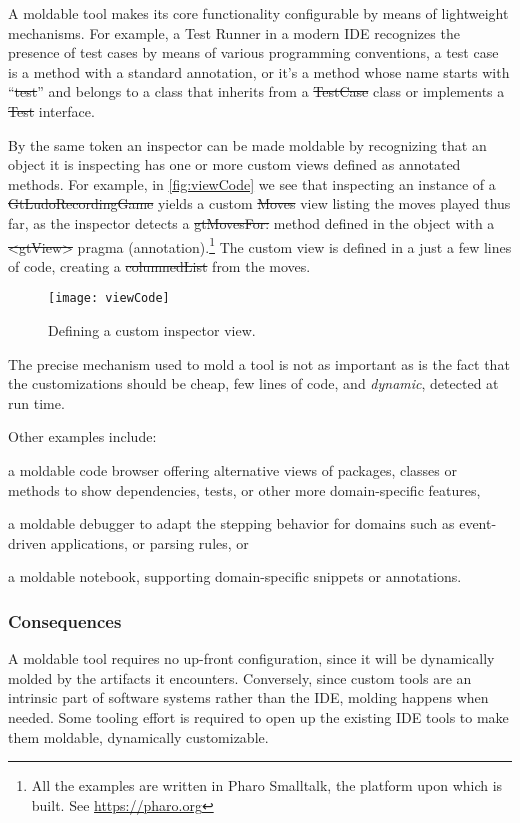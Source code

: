 \documentclass[sigconf]{acmart}
\newcommand{\GT}{\lst{GT}\xspace} %
\begin{document}
A moldable tool makes its core functionality configurable by means of lightweight mechanisms.
For example, a Test Runner in a modern IDE recognizes the presence of test cases by means of various programming conventions, \ie a test case is a method with a standard annotation, or it's a method whose name starts with ``\st{test}'' and belongs to a class that inherits from a \st{TestCase} class or implements a \st{Test} interface.

By the same token an inspector can be made moldable by recognizing that an object it is inspecting has one or more custom views defined as annotated methods.
For example, in \autoref{fig:viewCode} we see that inspecting an instance of a \st{GtLudoRecordingGame} yields a custom \st{Moves} view listing the moves played thus far, as the inspector detects a \st{gtMovesFor:} method defined in the object with a \st{<gtView>} pragma (\ie annotation).\footnote{All the examples are written in Pharo Smalltalk, the platform upon which \GT is built. See \url{https://pharo.org}}
The custom view is defined in a just a few lines of code, creating a \st{columnedList} from the moves.

\begin{figure}[h]
  \texttt{[image: viewCode]}
  \caption{Defining a custom inspector view.}
  \label{fig:viewCode}
\end{figure}

The precise mechanism used to mold a tool is not as important as is the fact that the customizations should be cheap, \ie few lines of code, and \emph{dynamic}, \ie detected at run time.

Other examples include:
\begin{inparaenum}[(i)]
\item a moldable code browser offering alternative views of packages, classes or methods to show dependencies, tests, or other more domain-specific features,
\item a moldable debugger to adapt the stepping behavior for domains such as event-driven applications, or parsing rules, or
\item a moldable notebook, supporting domain-specific snippets or annotations.
\end{inparaenum}

\subsubsection*{Consequences}
A moldable tool requires no up-front configuration, since it will be dynamically molded by the artifacts it encounters.
Conversely, since custom tools are an intrinsic part of software systems rather than the IDE, molding happens when needed.
Some tooling effort is required to open up the existing IDE tools to make them moldable, \ie dynamically customizable.
\end{document}
